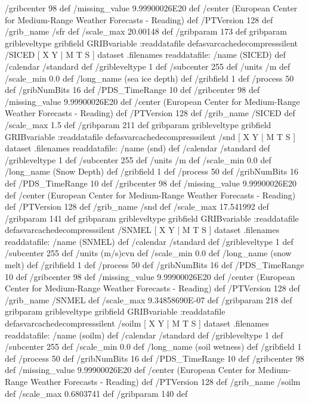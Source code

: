 \begin{ingrid}
{{ /gribcenter 98 def
 /missing_value 9.99900026E20 def
 /center (European Center for Medium-Range Weather Forecasts - Reading) def
 /PTVersion 128 def
 /grib_name /sfr def
 /scale_max 20.00148 def
 /gribparam 173 def
 gribparam gribleveltype gribfield GRIBvariable
 :readdatafile
}defasvarcachedecompresssilent
 /SICED{
[ X Y | M T S ] dataset .filenames readdatafile:
/name (SICED) def
 /calendar /standard def
 /gribleveltype 1 def
 /subcenter 255 def
 /units /m def
 /scale_min 0.0 def
 /long_name (sea ice depth) def
 /gribfield 1 def
 /process 50 def
 /gribNumBits 16 def
 /PDS_TimeRange 10 def
 /gribcenter 98 def
 /missing_value 9.99900026E20 def
 /center (European Center for Medium-Range Weather Forecasts - Reading) def
 /PTVersion 128 def
 /grib_name /SICED def
 /scale_max 1.5 def
 /gribparam 211 def
 gribparam gribleveltype gribfield GRIBvariable
 :readdatafile
}defasvarcachedecompresssilent
 /snd{
[ X Y | M T S ] dataset .filenames readdatafile:
/name (snd) def
 /calendar /standard def
 /gribleveltype 1 def
 /subcenter 255 def
 /units /m def
 /scale_min 0.0 def
 /long_name (Snow Depth) def
 /gribfield 1 def
 /process 50 def
 /gribNumBits 16 def
 /PDS_TimeRange 10 def
 /gribcenter 98 def
 /missing_value 9.99900026E20 def
 /center (European Center for Medium-Range Weather Forecasts - Reading) def
 /PTVersion 128 def
 /grib_name /snd def
 /scale_max 17.541992 def
 /gribparam 141 def
 gribparam gribleveltype gribfield GRIBvariable
 :readdatafile
}defasvarcachedecompresssilent
 /SNMEL{
[ X Y | M T S ] dataset .filenames readdatafile:
/name (SNMEL) def
 /calendar /standard def
 /gribleveltype 1 def
 /subcenter 255 def
 /units (m/s)cvn def
 /scale_min 0.0 def
 /long_name (snow melt) def
 /gribfield 1 def
 /process 50 def
 /gribNumBits 16 def
 /PDS_TimeRange 10 def
 /gribcenter 98 def
 /missing_value 9.99900026E20 def
 /center (European Center for Medium-Range Weather Forecasts - Reading) def
 /PTVersion 128 def
 /grib_name /SNMEL def
 /scale_max 9.34858690E-07 def
 /gribparam 218 def
 gribparam gribleveltype gribfield GRIBvariable
 :readdatafile
}defasvarcachedecompresssilent
 /soilm{
[ X Y | M T S ] dataset .filenames readdatafile:
/name (soilm) def
 /calendar /standard def
 /gribleveltype 1 def
 /subcenter 255 def
 /scale_min 0.0 def
 /long_name (soil wetness) def
 /gribfield 1 def
 /process 50 def
 /gribNumBits 16 def
 /PDS_TimeRange 10 def
 /gribcenter 98 def
 /missing_value 9.99900026E20 def
 /center (European Center for Medium-Range Weather Forecasts - Reading) def
 /PTVersion 128 def
 /grib_name /soilm def
 /scale_max 0.6803741 def
 /gribparam 140 def
}}
\end{ingrid}

